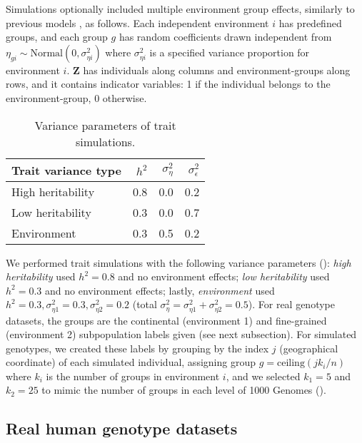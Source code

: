 \documentclass[9pt,lineno]{elife}
\begin{document}
Simulations optionally included multiple environment group effects, similarly to previous models \citep{zhang_principal_2015, wang_trade-offs_2022}, as follows.
Each independent environment $i$ has predefined groups, and each group $g$ has random coefficients drawn independent from $\eta_{gi} \sim \text{Normal}( 0, \sigma^2_{\eta i} )$ where $\sigma^2_{\eta i}$ is a specified variance proportion for environment $i$.
$\mathbf{Z}$ has individuals along columns and environment-groups along rows, and it contains indicator variables: 1 if the individual belongs to the environment-group, 0 otherwise.

\begin{table}[bt]
  \caption{Variance parameters of trait simulations.}
  \label{tab:trait-var-sim}
  \begin{tabular}{lrrr}
    \toprule
    Trait variance type & $h^2$ & $\sigma^2_\eta$ & $\sigma^2_\epsilon$ \\
    \midrule
    High heritability & 0.8 & 0.0 & 0.2 \\
    Low heritability  & 0.3 & 0.0 & 0.7 \\
    Environment       & 0.3 & 0.5 & 0.2 \\
    \bottomrule
  \end{tabular}
\end{table}

We performed trait simulations with the following variance parameters ():
\textit{high heritability} used $h^2 = 0.8$ and no environment effects;
\textit{low heritability} used $h^2 = 0.3$ and no environment effects;
lastly,
\textit{environment} used $h^2 = 0.3, \sigma^2_{\eta 1} = 0.3, \sigma^2_{\eta 2} = 0.2$ (total $\sigma^2_\eta = \sigma^2_{\eta 1} + \sigma^2_{\eta 2} = 0.5$).
For real genotype datasets, the groups are the continental (environment 1) and fine-grained (environment 2) subpopulation labels given (see next subsection).
For simulated genotypes, we created these labels by grouping by the index $j$ (geographical coordinate) of each simulated individual, assigning group $g = \text{ceiling}( j k_i / n )$ where $k_i$ is the number of groups in environment $i$, and we selected $k_1 = 5$ and $k_2 = 25$ to mimic the number of groups in each level of 1000 Genomes ().

\subsection{Real human genotype datasets}
\end{document}
